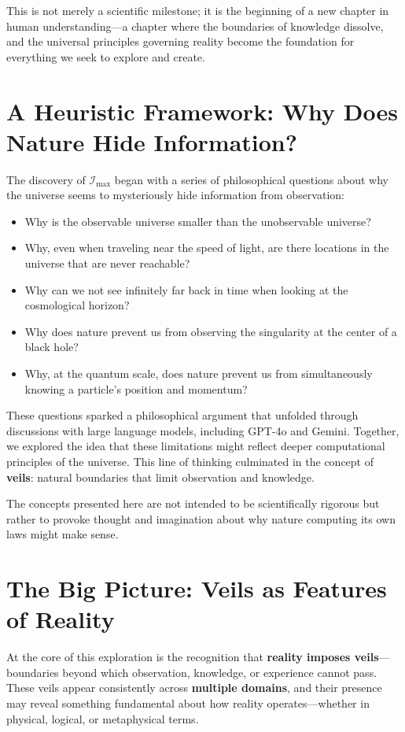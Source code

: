 \documentclass[12pt]{article}
\begin{document}
This is not merely a scientific milestone; it is the beginning of a new chapter in human understanding—a chapter where the boundaries of knowledge dissolve, and the universal principles governing reality become the foundation for everything we seek to explore and create.


\appendix

\section{A Heuristic Framework: Why Does Nature Hide Information?}

The discovery of $\mathcal{I}_{\text{max}}$ began with a series of philosophical questions about why the universe seems to mysteriously hide information from observation:
\begin{itemize}
    \item Why is the observable universe smaller than the unobservable universe?
    \item Why, even when traveling near the speed of light, are there locations in the universe that are never reachable?
    \item Why can we not see infinitely far back in time when looking at the cosmological horizon?
    \item Why does nature prevent us from observing the singularity at the center of a black hole?
    \item Why, at the quantum scale, does nature prevent us from simultaneously knowing a particle's position and momentum?
\end{itemize}

These questions sparked a philosophical argument that unfolded through discussions with large language models, including GPT-4o and Gemini. Together, we explored the idea that these limitations might reflect deeper computational principles of the universe. This line of thinking culminated in the concept of \textbf{veils}: natural boundaries that limit observation and knowledge.

The concepts presented here are not intended to be scientifically rigorous but rather to provoke thought and imagination about why nature computing its own laws might make sense.


\section{The Big Picture: Veils as Features of Reality}

At the core of this exploration is the recognition that \textbf{reality imposes veils}—boundaries beyond which observation, knowledge, or experience cannot pass. These veils appear consistently across \textbf{multiple domains}, and their presence may reveal something fundamental about how reality operates—whether in physical, logical, or metaphysical terms.
\end{document}
